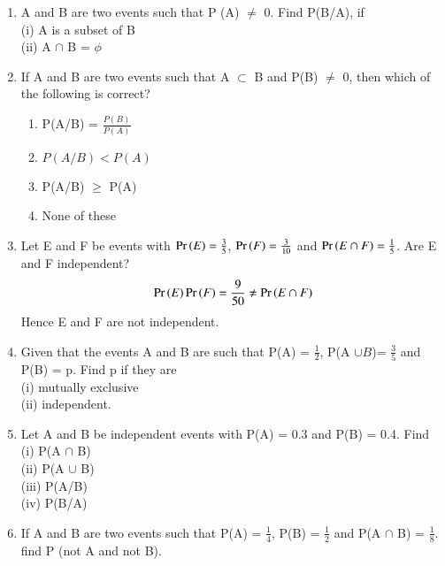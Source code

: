 \begin{enumerate}[label=\thesection.\arabic*.,ref=\thesection.\theenumi]
\item A and B are two events such that P (A) $\neq$ 0. Find P(B/A), if\\
(i) A is a subset of B \\
(ii) A $\cap$ B = $\phi$\\
\solution

\item If A and B are two events such that A $\subset$ B and P(B) $\neq$ 0, then which of the following is correct?\\
\begin{enumerate}
\item P(A/B) = $\frac{P(B)}{P(A)}$
\item $P(A/B) < P(A)$
\item P(A/B) $\geq$ P(A)
\item None of these
\end{enumerate}
\solution

\item Let E and F be events with $\Pr\left(E\right) = \frac{3}{5}$, $\Pr\left(F\right) = \frac{3}{10}$ and  $\Pr\left(E \cap F\right) = \frac{1}{5}$. Are E and F independent?
\\
\solution 
\begin{align}
\Pr\left(E\right)\Pr\left(F\right) = \frac{9}{50} \ne \Pr\left(E \cap F\right)
\end{align}
%
Hence E and F are not independent.
\item Given that the events A and B are such that P(A) = $\frac{1}{2}$, P(A $\cup B$)= $\frac{3}{5}$ and P(B) = p. Find p if they are\\
(i) mutually exclusive\\
(ii) independent.\\
\solution

\item Let A and B be independent events with P(A) = 0.3 and P(B) = 0.4. Find\\
(i) P(A $\cap$ B)\\ 
(ii) P(A $\cup$ B)\\
(iii) P(A/B)\\
(iv) P(B/A)\\
\solution

\item If A and B are two events such that P(A) = $\frac{1}{4}$, P(B) = $\frac{1}{2}$ and P(A $\cap$ B) = $\frac{1}{8}$. find P (not A and not B).\\
\solution



\end{enumerate}
